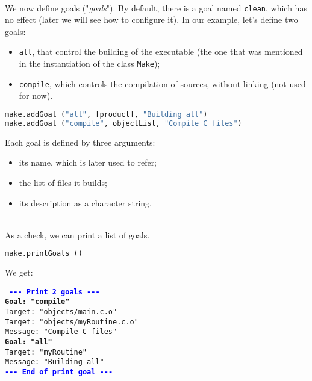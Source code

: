 \documentclass[a4paper,11pt]{extarticle}
\begin{document}
~\\We now define goals ("\emph{goals}"). By default, there is a goal named \texttt{clean}, which has no effect (later we will see how to configure it). In our example, let's define two goals:
\begin{itemize}
  \item \texttt{all}, that control the building of the executable (the one that was mentioned in the instantiation of the class \texttt{Make});
  \item \texttt{compile}, which controls the compilation of sources, without linking (not used for now).
\end{itemize}

\begin{lstlisting}[language=py]
make.addGoal ("all", [product], "Building all")
make.addGoal ("compile", objectList, "Compile C files")
\end{lstlisting}
Each goal is defined by three arguments:
\begin{itemize}
\item its name, which is later used to refer;
\item the list of files it builds;
\item its description as a character string.
\end{itemize}

~\\As a check, we can print a list of goals.
\begin{lstlisting}[language=py]
make.printGoals ()
\end{lstlisting}

We get:

\begin{mdframed}[hidealllines=true,backgroundcolor=lightgray!20]
\tt\footnotesize
\textcolor{blue}{\bf{-}{-}{-} Print 2 goals {-}{-}{-}}\\
\textcolor{OliveGreen}{\bf Goal: "compile"}\\
\hspace*{1.2em}Target: "objects/main.c.o"\\
\hspace*{1.2em}Target: "objects/myRoutine.c.o"\\
\hspace*{1.2em}Message: "Compile C files"\\
\textcolor{OliveGreen}{\bf Goal: "all"}\\
\hspace*{1.2em}Target: "myRoutine"\\
\hspace*{1.2em}Message: "Building all"\\
\textcolor{blue}{\bf{-}{-}{-} End of print goal {-}{-}{-}}
\end{mdframed}
\end{document}
